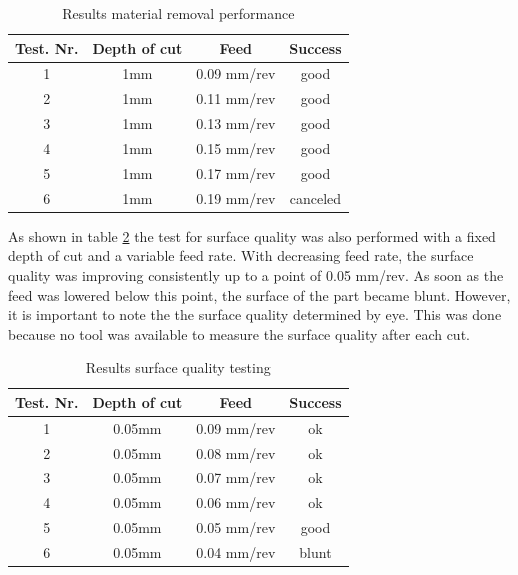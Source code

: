\begin{table}
    \centering
     \begin{tabular}{||c|c|c|c||} 
        \hline
        Test. Nr. & Depth of cut & Feed & Success\\ [0.5ex] 
        \hline\hline
        1 & 1mm      & 0.09 mm/rev      & good      \\ 
        2 & 1mm      & 0.11 mm/rev      & good      \\
        3 & 1mm      & 0.13 mm/rev      & good      \\
        4 & 1mm      & 0.15 mm/rev      & good      \\
        5 & 1mm      & 0.17 mm/rev      & good      \\
        6 & 1mm      & 0.19 mm/rev      & canceled  \\[1ex] 
        \hline
     \end{tabular}
     \caption{Results material removal performance}
     \label{Tab material removal performance}
\end{table}

As shown in table \ref{Tab surface quality testing} the test for surface quality was also performed with a fixed depth of cut and a variable feed rate. With decreasing feed rate, the surface quality was improving consistently up to a point of 0.05 mm/rev. As soon as the feed was lowered below this point, the surface of the part became blunt. However, it is important to note the the surface quality determined by eye. This was done because no tool was available to measure the surface quality after each cut.

\begin{table}
    \centering
     \begin{tabular}{||c|c|c|c||} 
        \hline
        Test. Nr. & Depth of cut & Feed & Success\\ [0.5ex] 
        \hline\hline
        1 & 0.05mm      & 0.09 mm/rev      & ok      \\ 
        2 & 0.05mm      & 0.08 mm/rev      & ok      \\
        3 & 0.05mm      & 0.07 mm/rev      & ok      \\
        4 & 0.05mm      & 0.06 mm/rev      & ok      \\
        5 & 0.05mm      & 0.05 mm/rev      & good    \\
        6 & 0.05mm      & 0.04 mm/rev      & blunt  \\[1ex] 
        \hline
     \end{tabular}
     \caption{Results surface quality testing}
     \label{Tab surface quality testing}
\end{table}

